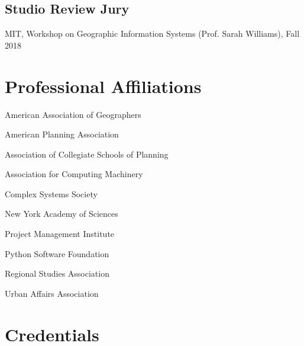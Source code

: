 \documentclass[12pt,letterpaper]{report}
\newcommand{\listitemspace}{0.15em}
\renewenvironment{itemize}
{\begin{list}{}{\setlength{\leftmargin}{0em}
            \setlength{\parskip}{0em}
            \setlength{\itemsep}{\listitemspace}
            \setlength{\parsep}{\listitemspace}}}
    {\end{list}}
\begin{document}
    \subsection*{Studio Review Jury}
    
    \begin{itemize}
        
        \item MIT, Workshop on Geographic Information Systems (Prof. Sarah Williams), Fall 2018
    
    \end{itemize}


    \section*{Professional Affiliations}

    \begin{itemize}

        \item American Association of Geographers

        \item American Planning Association

        \item Association of Collegiate Schools of Planning

        \item Association for Computing Machinery

        \item Complex Systems Society

        \item New York Academy of Sciences

        \item Project Management Institute

        \item Python Software Foundation
        
        \item Regional Studies Association

        \item Urban Affairs Association

    \end{itemize}



    \section*{Credentials}
\end{document}
